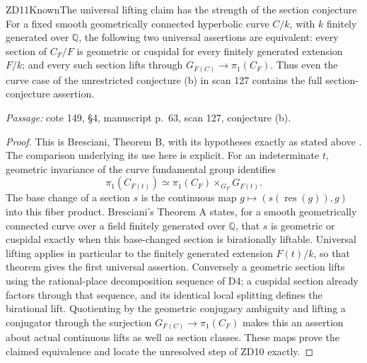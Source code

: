 \begin{result}{ZD11}{Known}{The universal lifting claim has the strength of the section conjecture}
For a fixed smooth geometrically connected hyperbolic curve $C/k$, with $k$ finitely generated over $\mathbb Q$, the following two universal assertions are equivalent: every section of $C_F/F$ is geometric or cuspidal for every finitely generated extension $F/k$; and every such section lifts through $G_{F(C)}\to\pi_1(C_F)$. Thus even the curve case of the unrestricted conjecture (b) in scan 127 contains the full section-conjecture assertion.
\par\emph{Passage:} cote 149, \S4, manuscript p.~63, scan 127, conjecture (b).
\end{result}
\begin{proof}
This is Bresciani, Theorem B, with its hypotheses exactly as stated above \cite{DE_Bresciani}. The comparison underlying its use here is explicit. For an indeterminate $t$, geometric invariance of the curve fundamental group identifies
\[
 \pi_1(C_{F(t)})\simeq\pi_1(C_F)\times_{G_F}G_{F(t)}.
\]
The base change of a section $s$ is the continuous map $g\mapsto(s(\operatorname{res}(g)),g)$ into this fiber product. Bresciani's Theorem A states, for a smooth geometrically connected curve over a field finitely generated over $\mathbb Q$, that $s$ is geometric or cuspidal exactly when this base-changed section is birationally liftable. Universal lifting applies in particular to the finitely generated extension $F(t)/k$, so that theorem gives the first universal assertion. Conversely a geometric section lifts using the rational-place decomposition sequence of D4; a cuspidal section already factors through that sequence, and its identical local splitting defines the birational lift. Quotienting by the geometric conjugacy ambiguity and lifting a conjugator through the surjection $G_{F(C)}\to\pi_1(C_F)$ makes this an assertion about actual continuous lifts as well as section classes. These maps prove the claimed equivalence and locate the unresolved step of ZD10 exactly.
\end{proof}
